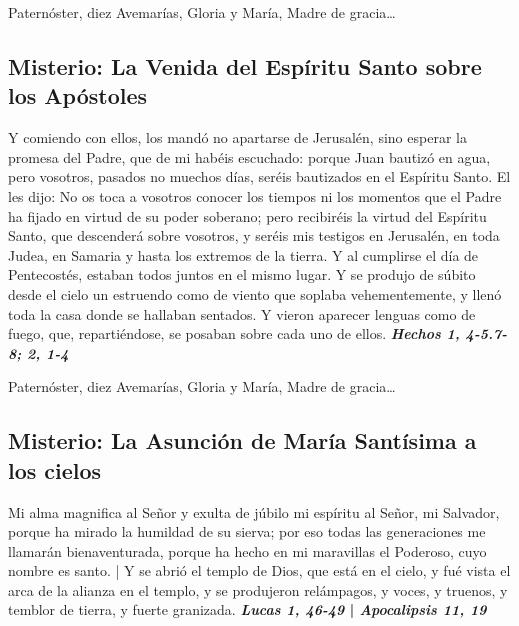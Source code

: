 \documentclass[./rosary.tex]{subfiles}
\newcounter{glorious-counter}
\begin{document}
\begin{center}
      Paternóster, diez Avemarías, Gloria y María, Madre de gracia{\ldots}
\end{center}

\bigskip

\subsection*{ Misterio: La Venida del Espíritu Santo sobre los Apóstoles}

Y comiendo con ellos, los mandó no apartarse de Jerusalén, sino esperar la promesa del Padre, que de mi habéis escuchado: porque Juan bautizó en agua, pero vosotros, pasados no muechos días,
seréis bautizados en el Espíritu Santo. El les dijo: No os toca a vosotros conocer los tiempos ni los momentos que el Padre ha fijado en virtud de su poder soberano; pero recibiréis 
la virtud del Espíritu Santo, que descenderá sobre vosotros, y seréis mis testigos en Jerusalén, en toda Judea, en Samaria y hasta los extremos de la tierra. Y al cumplirse el día de Pentecostés, 
estaban todos juntos en el mismo lugar. Y se produjo de súbito desde el cielo un estruendo como de viento que soplaba vehementemente, y llenó toda la casa donde se hallaban sentados. 
Y vieron aparecer lenguas como de fuego, que, repartiéndose, se posaban sobre cada uno de ellos. \textbf{\emph{Hechos 1, 4-5.7-8; 2, 1-4}}

\begin{center}
      Paternóster, diez Avemarías, Gloria y María, Madre de gracia{\ldots}
\end{center}

\bigskip

\subsection*{ Misterio: La Asunción de María Santísima a los cielos}

Mi alma magnifica al Señor y exulta de júbilo mi espíritu al Señor, mi Salvador, porque ha mirado la humildad de su sierva; por eso todas las generaciones
me llamarán bienaventurada, porque ha hecho en mi maravillas el Poderoso, cuyo nombre es santo. | Y se abrió el templo de Dios, que está en el cielo, y 
fué vista el arca de la alianza en el templo, y se produjeron relámpagos, y voces, y truenos, y temblor de tierra, y fuerte granizada. 
\textbf{\emph{Lucas 1, 46-49} | \emph{Apocalipsis 11, 19}}
\end{document}
